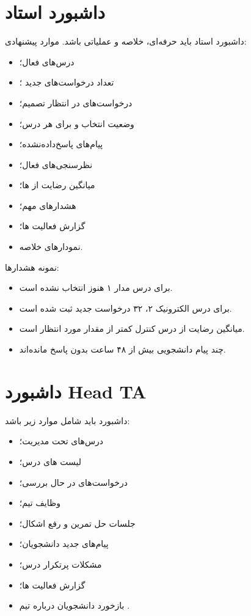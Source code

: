 \documentclass[12pt,a4paper]{article}
\begin{document}
\section{داشبورد استاد}
داشبورد استاد باید حرفه‌ای، خلاصه و عملیاتی باشد. موارد پیشنهادی:
\begin{itemize}
\item درس‌های فعال؛
\item تعداد درخواست‌های جدید ؛
\item درخواست‌های در انتظار تصمیم؛
\item وضعیت انتخاب  و  برای هر درس؛
\item پیام‌های پاسخ‌داده‌نشده؛
\item نظرسنجی‌های فعال؛
\item میانگین رضایت از ها؛
\item هشدارهای مهم؛
\item گزارش فعالیت ها؛
\item نمودارهای خلاصه.
\end{itemize}

نمونه هشدارها:
\begin{itemize}
\item برای درس مدار ۱ هنوز  انتخاب نشده است.
\item برای درس الکترونیک ۲، ۳۲ درخواست جدید ثبت شده است.
\item میانگین رضایت از  درس کنترل کمتر از مقدار مورد انتظار است.
\item چند پیام دانشجویی بیش از ۴۸ ساعت بدون پاسخ مانده‌اند.
\end{itemize}

\section{داشبورد Head TA}
داشبورد  باید شامل موارد زیر باشد:
\begin{itemize}
\item درس‌های تحت مدیریت؛
\item لیست های درس؛
\item درخواست‌های در حال بررسی؛
\item وظایف تیم؛
\item جلسات حل تمرین و رفع اشکال؛
\item پیام‌های جدید دانشجویان؛
\item مشکلات پرتکرار درس؛
\item گزارش فعالیت ها؛
\item بازخورد دانشجویان درباره تیم .
\end{itemize}
\end{document}
